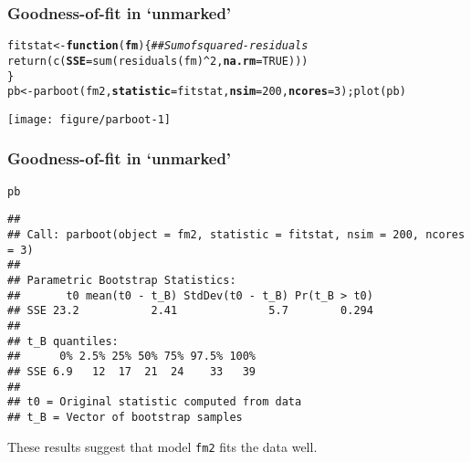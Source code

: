 \documentclass[color=usenames,dvipsnames]{beamer}\usepackage[]{graphicx}\usepackage[]{color}
\makeatletter
\newcommand{\hlnum}[1]{\textcolor[rgb]{0.69,0.494,0}{#1}}%
\newcommand{\hlcom}[1]{\textcolor[rgb]{0.514,0.506,0.514}{\textit{#1}}}%
\newcommand{\hlopt}[1]{\textcolor[rgb]{0,0,0}{#1}}%
\newcommand{\hlstd}[1]{\textcolor[rgb]{0,0,0}{#1}}%
\newcommand{\hlkwa}[1]{\textcolor[rgb]{0,0,0}{\textbf{#1}}}%
\newcommand{\hlkwb}[1]{\textcolor[rgb]{0,0.341,0.682}{#1}}%
\newcommand{\hlkwc}[1]{\textcolor[rgb]{0,0,0}{\textbf{#1}}}%
\newcommand{\hlkwd}[1]{\textcolor[rgb]{0.004,0.004,0.506}{#1}}%
\newenvironment{kframe}{%
 \def\at@end@of@kframe{}%
 \ifinner\ifhmode%
  \def\at@end@of@kframe{\end{minipage}}%
  \begin{minipage}{\columnwidth}%
 \fi\fi%
 \def\FrameCommand##1{\hskip\@totalleftmargin \hskip-\fboxsep
 \colorbox{shadecolor}{##1}\hskip-\fboxsep
     \hskip-\linewidth \hskip-\@totalleftmargin \hskip\columnwidth}%
 \MakeFramed {\advance\hsize-\width
   \@totalleftmargin\z@ \linewidth\hsize
   \@setminipage}}%
 {\par\unskip\endMakeFramed%
 \at@end@of@kframe}
\newenvironment{knitrout}{}{} %
\newcommand{\inr}[1]{\colorbox{inlinecolor}{\texttt{#1}}}
\makeatother
\begin{document}
\begin{frame}[fragile]
  \frametitle{Goodness-of-fit in `unmarked'}
\begin{knitrout}\scriptsize
{}\color{fgcolor}\begin{kframe}
\begin{alltt}
\hlstd{fitstat} \hlkwb{<-} \hlkwa{function}\hlstd{(}\hlkwc{fm}\hlstd{) \{} \hlcom{## Sum of squared-residuals}
    \hlkwd{return}\hlstd{(}\hlkwd{c}\hlstd{(}\hlkwc{SSE}\hlstd{=}\hlkwd{sum}\hlstd{(}\hlkwd{residuals}\hlstd{(fm)}\hlopt{^}\hlnum{2}\hlstd{,} \hlkwc{na.rm}\hlstd{=}\hlnum{TRUE}\hlstd{)))}
\hlstd{\}}
\hlstd{pb} \hlkwb{<-} \hlkwd{parboot}\hlstd{(fm2,} \hlkwc{statistic}\hlstd{=fitstat,} \hlkwc{nsim}\hlstd{=}\hlnum{200}\hlstd{,} \hlkwc{ncores}\hlstd{=}\hlnum{3}\hlstd{);} \hlkwd{plot}\hlstd{(pb)}
\end{alltt}
\end{kframe}

{\centering \texttt{[image: figure/parboot-1]} 

}



\end{knitrout}
\end{frame}



\begin{frame}[fragile]
  \frametitle{Goodness-of-fit in `unmarked'}
\begin{knitrout}\scriptsize
{}\color{fgcolor}\begin{kframe}
\begin{alltt}
\hlstd{pb}
\end{alltt}
\begin{verbatim}
## 
## Call: parboot(object = fm2, statistic = fitstat, nsim = 200, ncores = 3)
## 
## Parametric Bootstrap Statistics:
##       t0 mean(t0 - t_B) StdDev(t0 - t_B) Pr(t_B > t0)
## SSE 23.2           2.41              5.7        0.294
## 
## t_B quantiles:
##      0% 2.5% 25% 50% 75% 97.5% 100%
## SSE 6.9   12  17  21  24    33   39
## 
## t0 = Original statistic computed from data
## t_B = Vector of bootstrap samples
\end{verbatim}
\end{kframe}
\end{knitrout}
\vfill
These results suggest that model \inr{fm2} fits the data well.
\end{frame}
\end{document}
